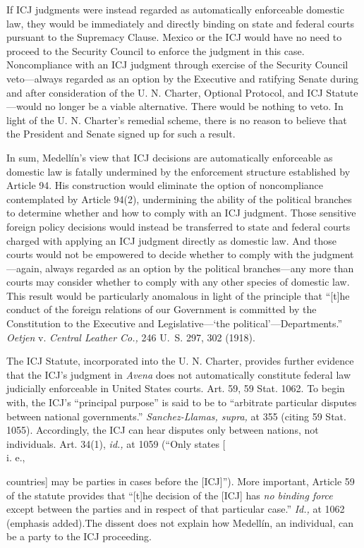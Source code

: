 {{{  If ICJ judgments were instead regarded as automatically enforceable
domestic law, they would be immediately and directly binding on state
and federal courts pursuant to the Supremacy Clause. Mexico or the
ICJ would have no need to proceed to the Security Council to enforce
the judgment in this case. Noncompliance with an ICJ judgment through
exercise of the Security Council veto---always regarded as an option by
the Executive and ratifying Senate during and after consideration of the
U. N. Charter, Optional Protocol, and ICJ Statute---would no longer be
a viable alternative. \newpage  There would be nothing to veto. In light
of the U. N. Charter's remedial scheme, there is no reason to believe
that the President and Senate signed up for such a result.

  In sum, Medellín's view that ICJ decisions are automatically
enforceable as domestic law is fatally undermined by the enforcement
structure established by Article 94. His construction would eliminate
the option of noncompliance contemplated by Article 94(2), undermining
the ability of the political branches to determine whether and how to
comply with an ICJ judgment. Those sensitive foreign policy decisions
would instead be transferred to state and federal courts charged
with applying an ICJ judgment directly as domestic law. And those
courts would not be empowered to decide whether to comply with the
judgment---again, always regarded as an option by the political
branches---any more than courts may consider whether to comply with
any other species of domestic law. This result would be particularly
anomalous in light of the principle that ``[t]he conduct of the foreign
relations of our Government is committed by the Constitution to the
Executive and Legislative---‘the political'---Departments.''
\emph{Oetjen} v. \emph{Central Leather Co.,} 246 U.~S. 297, 302 (1918).

  The ICJ Statute, incorporated into the U. N. Charter, provides further
evidence that the ICJ's judgment in \emph{Avena} does not automatically
constitute federal law judicially enforceable in United States courts.
Art. 59, 59 Stat. 1062. To begin with, the ICJ's ``principal
purpose'' is said to be to ``arbitrate particular disputes between
national governments.'' \emph{Sanchez-Llamas, supra,} at 355 (citing
59 Stat. 1055). Accordingly, the ICJ can hear disputes only between
nations, not individuals. Art. 34(1), \emph{id.,} at 1059 (``Only states
[\\i. e.,} countries] may be parties in cases before the [ICJ]'').
More important, Article 59 of the statute provides that ``[t]he
decision of the [ICJ] has \emph{no binding force} except between the
parties and in respect of that particular case.'' \newpage  \emph{Id.,} at
1062 (emphasis added).The dissent does not explain how Medellín, an
individual, can be a party to the ICJ proceeding.

}}
